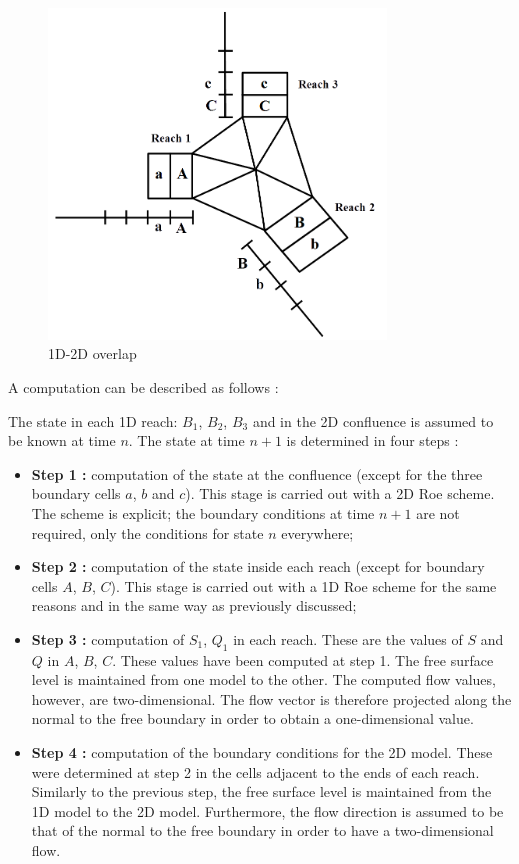 \begin{figure}[H]
 \begin{center}
  \includegraphics[width=0.8\textwidth]{Figures/ConfPar2.png}
  \caption{1D-2D overlap}
 \end{center}
\end{figure}

A computation can be described as follows :

The state in each 1D reach: $B_1$, $B_2$, $B_3$ and in the 2D confluence is assumed to be known at time $n$. The state at time $n+1$ is determined in four steps :
\begin{itemize}
 \item \textbf{Step 1 :} computation of the state at the confluence (except for the three boundary cells $a$, $b$ and $c$). This stage is carried out with a 2D Roe scheme. The scheme is explicit; the boundary conditions at time $n+1$ are not required, only the conditions for state $n$ everywhere;
 \item \textbf{Step 2 :} computation of the state inside each reach (except for boundary cells $A$, $B$, $C$). This stage is carried out with a 1D Roe scheme for the same reasons and in the same way as previously discussed;
 \item \textbf{Step 3 :} computation of $S_1$, $Q_1$ in each reach. These are the values of $S$ and $Q$ in $A$, $B$, $C$. These values have been computed at step 1. The free surface level is maintained from one model to the other. The computed flow values, however, are two-dimensional. The flow vector is therefore projected along the normal to the free boundary in order to obtain a one-dimensional value.
 \item \textbf{Step 4 :} computation of the boundary conditions for the 2D model. These were determined at step 2 in the cells adjacent to the ends of each reach. Similarly to the previous step, the free surface level is maintained from the 1D model to the 2D model. Furthermore, the flow direction is assumed to be that of the normal to the free boundary in order to have a two-dimensional flow.
\end{itemize}

